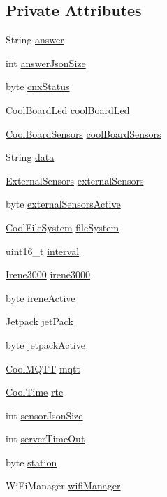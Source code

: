\subsection*{Private Attributes}
\begin{DoxyCompactItemize}
\item 
String \hyperlink{classCoolBoard_a7b835fafd449e5282f7f91d787a2dc15}{answer}
\item 
int \hyperlink{classCoolBoard_af2da1f85315b3d074a8b87d158094fb7}{answer\+Json\+Size}
\item 
byte \hyperlink{classCoolBoard_abe31430e52476aff208dccf19a59c9b4}{cnx\+Status}
\item 
\hyperlink{classCoolBoardLed}{Cool\+Board\+Led} \hyperlink{classCoolBoard_a1b1d3c684a5baa56b08486e192fd8e97}{cool\+Board\+Led}
\item 
\hyperlink{classCoolBoardSensors}{Cool\+Board\+Sensors} \hyperlink{classCoolBoard_af102be5288bd7f7a8e59b13f86e26a00}{cool\+Board\+Sensors}
\item 
String \hyperlink{classCoolBoard_a427fb753dd8575bdf821c70a5c63d695}{data}
\item 
\hyperlink{classExternalSensors}{External\+Sensors} \hyperlink{classCoolBoard_a09e26264839c65873eb56af476eff6b2}{external\+Sensors}
\item 
byte \hyperlink{classCoolBoard_af29860cc422622dc33614f9eabb58c40}{external\+Sensors\+Active}
\item 
\hyperlink{classCoolFileSystem}{Cool\+File\+System} \hyperlink{classCoolBoard_a42c2586fbb13ff7f06538e9284e8538d}{file\+System}
\item 
uint16\+\_\+t \hyperlink{classCoolBoard_a6d5c2603e162dcd6e7626a5b90f30837}{interval}
\item 
\hyperlink{classIrene3000}{Irene3000} \hyperlink{classCoolBoard_ad103718ce316006c4695b8eb312eaf11}{irene3000}
\item 
byte \hyperlink{classCoolBoard_a1de9b5516695b2e1668bf2e3a6701332}{irene\+Active}
\item 
\hyperlink{classJetpack}{Jetpack} \hyperlink{classCoolBoard_a30b1357881b01ccbec676856a91e48e9}{jet\+Pack}
\item 
byte \hyperlink{classCoolBoard_a4dc6ff276ed178975bd8b459fa7421dc}{jetpack\+Active}
\item 
\hyperlink{classCoolMQTT}{Cool\+M\+Q\+TT} \hyperlink{classCoolBoard_a2399f44d7c23c1149a335cb3b46d90f1}{mqtt}
\item 
\hyperlink{classCoolTime}{Cool\+Time} \hyperlink{classCoolBoard_a50d2a6716879d64a85f3c6b44ad63275}{rtc}
\item 
int \hyperlink{classCoolBoard_a58e4b6072e3ac8b141ec0befb479208e}{sensor\+Json\+Size}
\item 
int \hyperlink{classCoolBoard_a7a8d8d3d316220cdd049cd63c1aa8fe6}{server\+Time\+Out}
\item 
byte \hyperlink{classCoolBoard_a164c550df8424e32fe90bce460c7becf}{station}
\item 
Wi\+Fi\+Manager \hyperlink{classCoolBoard_a55b28656e295140928557c47d7fff01e}{wifi\+Manager}
\end{DoxyCompactItemize}


